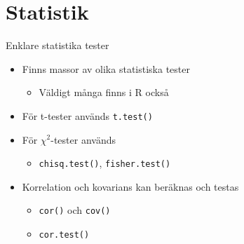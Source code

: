 \documentclass[
  11pt,
  ignorenonframetext,
  handout]{beamer}
\providecommand{\tightlist}{%
  \setlength{\itemsep}{0pt}\setlength{\parskip}{0pt}}
\begin{document}
\section{Statistik}\label{statistik}

\begin{frame}{Enklare statistika tester}
\label{enklare-statistika-tester}
\begin{itemize}
\tightlist
\item
  Finns massor av olika statistiska tester

  \begin{itemize}
  \tightlist
  \item
    Väldigt många finns i R också
  \end{itemize}
\item
  För t-tester används \texttt{t.test()}
\item
  För \(\chi^2\)-tester används

  \begin{itemize}
  \tightlist
  \item
    \texttt{chisq.test()}, \texttt{fisher.test()}
  \end{itemize}
\item
  Korrelation och kovarians kan beräknas och testas

  \begin{itemize}
  \tightlist
  \item
    \texttt{cor()} och \texttt{cov()}
  \item
    \texttt{cor.test()}
  \end{itemize}
\end{itemize}
\end{frame}
\end{document}
